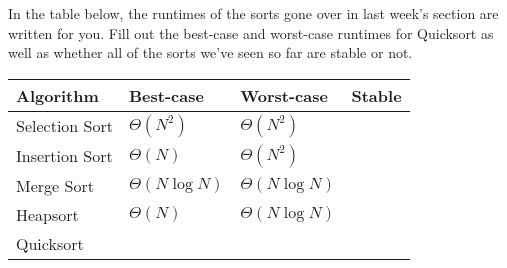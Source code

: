 \begin{blocksection}
In the table below, the runtimes of the sorts gone over in last week's section are written for you. Fill out the best-case and worst-case runtimes for Quicksort as well as whether all of the sorts we've seen so far are stable or not.
\end{blocksection}

\ifprintanswers\else
{
\renewcommand{\arraystretch}{2}
\setlength{\tabcolsep}{12pt}
\begin{tabularx}{\textwidth}{Xlll}
Algorithm         & Best-case & Worst-case & Stable \\\hline
Selection Sort    & $\Theta(N^2)$      & $\Theta(N^2)$       & \\
Insertion Sort    & $\Theta(N)$        & $\Theta(N^2)$       & \\
Merge Sort        & $\Theta(N \log N)$ & $\Theta(N \log N)$  & \\
Heapsort          & $\Theta(N)$        & $\Theta(N \log N)$  & 	\\
Quicksort         &   &   & 
\end{tabularx}
}
\fi

